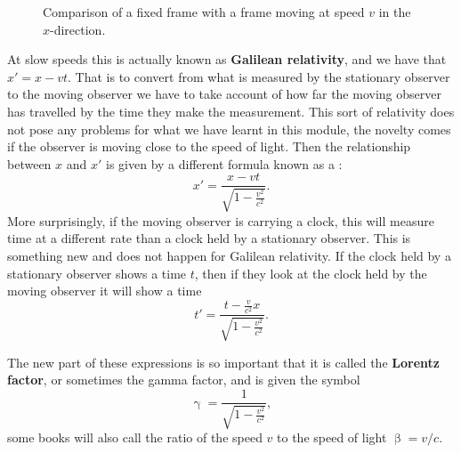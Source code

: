 \documentclass[a4paper,12pt]{book}
\begin{document}
\begin{figure}[ht]
    \centering
    \caption{Comparison of a fixed frame with a frame moving at speed $v$ in the $x$-direction.}
    \label{fig: moving frames}
\end{figure} 

At slow speeds this is actually known as \textbf{Galilean relativity}, and we have that $x'=x-vt$. That is to convert from what is measured by the stationary observer to the moving observer we have to take account of how far the moving observer has travelled by the time they make the measurement. This sort of relativity does not pose any problems for what we have learnt in this module, the novelty comes if the observer is moving close to the speed of light. Then the relationship between $x$ and $x'$ is given by a different formula known as a :
\begin{equation}
x'=\frac{x-vt}{\sqrt{1-\frac{v^{2}}{c^{2}}}}.
\label{eq: length contraction}
\end{equation}
More surprisingly, if the moving observer is carrying a clock, this will measure time at a different rate than a clock held by a stationary observer. This is something new and does not happen for Galilean relativity. If the clock held by a stationary observer shows a time $t$, then if they look at the clock held by the moving observer it will show a time
\begin{equation}
t'=\frac{t-\frac{v}{c^{2}}x}{\sqrt{1-\frac{v^{2}}{c^{2}}}}.
\label{eq: time dilation}
\end{equation}

The new part of these expressions is so important that it is called the \textbf{Lorentz factor}, or sometimes the gamma factor, and is given the symbol
\begin{equation}
\upgamma=\frac{1}{\sqrt{1-\frac{v^{2}}{c^{2}}}},
\end{equation}
some books will also call the ratio of the speed $v$ to the speed of light $\upbeta=v/c$.\\
\end{document}
